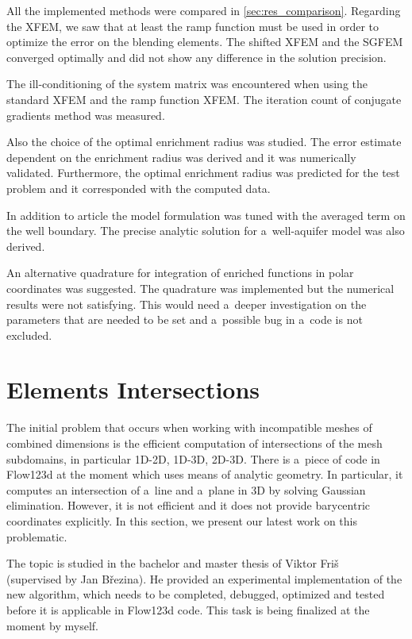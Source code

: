 \documentclass[FM,Dis]{tulthesis}
\begin{document}
All the implemented methods were compared in \ref{sec:res_comparison}. Regarding the XFEM, we saw that at 
least the ramp function must be used in order to optimize the error on the blending elements. 
The shifted XFEM and the SGFEM converged optimally and did not show any difference in the solution precision.

The ill-conditioning of the system matrix was encountered when using the standard XFEM and the ramp function XFEM.
The iteration count of conjugate gradients method was measured.

Also the choice of the optimal enrichment radius was studied. The error estimate dependent on the enrichment
radius was derived and it was numerically validated. Furthermore, the optimal enrichment radius was predicted 
for the test problem and it corresponded with the computed data.

In addition to article \cite{exner_2016} the model formulation was tuned with the averaged term on the well
boundary. The precise analytic solution for a~well-aquifer model was also derived.

An alternative quadrature for integration of enriched functions in polar coordinates was suggested.
The quadrature was implemented but the numerical results were not satisfying. This would need a~deeper 
investigation on the parameters that are needed to be set and a~possible bug in a~code is not excluded.



\newpage
\section{Elements Intersections}
\label{sec:elements_intersections}
The initial problem that occurs when working with incompatible meshes of combined dimensions is the efficient 
computation of intersections of the mesh subdomains, in particular 1D-2D, 1D-3D, 2D-3D.
There is a~piece of code in Flow123d at the moment which uses means of analytic geometry. In particular, it computes 
an intersection of a~line and a~plane in 3D by solving Gaussian elimination. However, it is not efficient
and it does not provide barycentric coordinates explicitly.
In this section, we present our latest work on this problematic.

The topic is studied in the bachelor and master thesis of Viktor Fri{\v s} ~\cite{fris_dp_2015} (supervised by 
Jan B{\v r}ezina). He provided an experimental implementation of the new algorithm, which needs to be completed,
debugged, optimized and tested before it is applicable in Flow123d code. 
This task is being finalized at the moment by myself.
\end{document}
